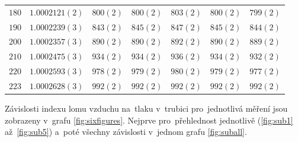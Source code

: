 \documentclass{../concepts/titul_zprava_p/prepareprotokolZprava} %
\begin{document}
\begin{table}[!htbp]
\begin{tabular}{cc|ccccc}
 $180$ & $1.0002121(2)$ & $800(2)$ & $800(2)$ & $803(2)$ & $800(2)$ & $799(2)$ \\
 $190$ & $1.0002239(3)$ & $843(2)$ & $845(2)$ & $847(2)$ & $845(2)$ & $844(2)$ \\
 $200$ & $1.0002357(3)$ & $890(2)$ & $890(2)$ & $892(2)$ & $890(2)$ & $889(2)$ \\
 $210$ & $1.0002475(3)$ & $934(2)$ & $934(2)$ & $936(2)$ & $934(2)$ & $932(2)$ \\
 $220$ & $1.0002593(3)$ & $978(2)$ & $979(2)$ & $980(2)$ & $979(2)$ & $977(2)$ \\
 $223$ & $1.0002628(3)$ & $992(2)$ & $992(2)$ & $992(2)$ & $992(2)$ & $992(2)$ \\
 \bottomrule
\end{tabular}
\label{tab:tlaky}
\end{table}

Závislosti indexu lomu vzduchu na~tlaku v~trubici pro~jednotlivá měření jsou zobrazeny v~grafu \ref{fig:sixfigures}.
Nejprve pro~přehlednost jednotlivě (\ref{fig:sub1} až~\ref{fig:sub5}) a~poté všechny závislosti v~jednom grafu \ref{fig:suball}.
\end{document}
